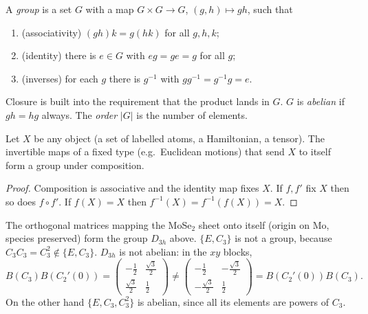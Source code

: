 \begin{definition}[Group]
A \emph{group} is a set $G$ with a map $G\times G\to G$, $(g,h)\mapsto gh$, such that
\begin{enumerate}
    \item (associativity) $(gh)k = g(hk)$ for all $g,h,k$;
    \item (identity) there is $e\in G$ with $eg = ge = g$ for all $g$;
    \item (inverses) for each $g$ there is $g^{-1}$ with $gg^{-1} = g^{-1}g = e$.
\end{enumerate}
Closure is built into the requirement that the product lands in $G$. $G$ is \emph{abelian} if $gh = hg$ always. The \emph{order} $|G|$ is the number of elements.
\end{definition}

\begin{theorem}
Let $X$ be any object (a set of labelled atoms, a Hamiltonian, a tensor). The invertible maps of a fixed type (e.g.\ Euclidean motions) that send $X$ to itself form a group under composition.
\end{theorem}
\begin{proof}
Composition is associative and the identity map fixes $X$. If $f, f'$ fix $X$ then so does $f\circ f'$. If $f(X) = X$ then $f^{-1}(X) = f^{-1}(f(X)) = X$.
\end{proof}

\begin{example}
The orthogonal matrices mapping the MoSe$_2$ sheet onto itself (origin on Mo, species preserved) form the group $D_{3h}$ above. $\{E, C_3\}$ is not a group, because $C_3C_3 = C_3^2\notin\{E,C_3\}$. $D_{3h}$ is not abelian: in the $xy$ blocks,
\[
    B(C_3)B(C_2'(0)) = \begin{pmatrix}-\tfrac12&\tfrac{\sqrt3}2\\\tfrac{\sqrt3}2&\tfrac12\end{pmatrix}
    \neq
    \begin{pmatrix}-\tfrac12&-\tfrac{\sqrt3}2\\-\tfrac{\sqrt3}2&\tfrac12\end{pmatrix} = B(C_2'(0))B(C_3).
\]
On the other hand $\{E, C_3, C_3^2\}$ is abelian, since all its elements are powers of $C_3$.
\end{example}

